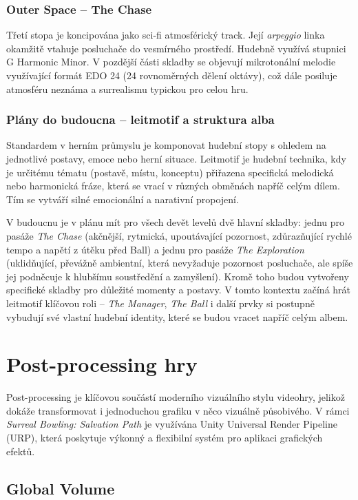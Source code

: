 \subsubsection{Outer Space -- The Chase}
Třetí stopa je koncipována jako sci-fi atmosférický track. Její \emph{arpeggio} linka okamžitě vtahuje posluchače do vesmírného prostředí. Hudebně využívá stupnici G Harmonic Minor. V pozdější části skladby se objevují mikrotonální melodie využívající formát EDO 24 (24 rovnoměrných dělení oktávy), což dále posiluje atmosféru neznáma a surrealismu typickou pro celou hru.

\subsubsection{Plány do budoucna -- leitmotif a struktura alba}
Standardem v herním průmyslu je komponovat hudební stopy s ohledem na jednotlivé postavy, emoce nebo herní situace. Leitmotif je hudební technika, kdy je určitému tématu (postavě, místu, konceptu) přiřazena specifická melodická nebo harmonická fráze, která se vrací v různých obměnách napříč celým dílem. Tím se vytváří silné emocionální a narativní propojení.

V budoucnu je v plánu mít pro všech devět levelů dvě hlavní skladby: jednu pro pasáže \emph{The Chase} (akčnější, rytmická, upoutávající pozornost, zdůrazňující rychlé tempo a napětí z útěku před Ball) a jednu pro pasáže \emph{The Exploration} (uklidňující, převážně ambientní, která nevyžaduje pozornost posluchače, ale spíše jej podněcuje k hlubšímu soustředění a zamyšlení). Kromě toho budou vytvořeny specifické skladby pro důležité momenty a postavy. V tomto kontextu začíná hrát leitmotif klíčovou roli -- \emph{The Manager}, \emph{The Ball} i další prvky si postupně vybudují své vlastní hudební identity, které se budou vracet napříč celým albem.

\section{Post-processing hry}
\label{sec:post-processing-hry}

Post-processing je klíčovou součástí moderního vizuálního stylu videohry, jelikož dokáže transformovat i jednoduchou grafiku v něco vizuálně působivého. V rámci \emph{Surreal Bowling: Salvation Path} je využívána Unity Universal Render Pipeline (URP), která poskytuje výkonný a flexibilní systém pro aplikaci grafických efektů.


\subsection{Global Volume}
\label{sec:global-volume}

